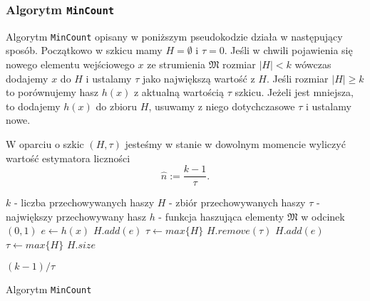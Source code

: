 \subsubsection{Algorytm \texttt{MinCount}}

Algorytm \texttt{MinCount} opisany w poniższym pseudokodzie działa w następujący sposób.
Początkowo w szkicu mamy $H = \emptyset$ i $\tau = 0$.
Jeśli w chwili pojawienia się nowego elementu wejściowego $x$
 ze strumienia $\mathfrak{M}$ rozmiar $|H|< k$ wówczas dodajemy $x$ do $H$ i ustalamy $\tau$ jako największą wartość z $H$.
 Jeśli rozmiar $|H|\geq k$ to porównujemy hasz $h(x)$ z aktualną wartością  ${\tau}$ szkicu. Jeżeli jest mniejsza, to dodajemy $h(x)$ do zbioru $H$, usuwamy z niego dotychczasowe ${\tau}$ i ustalamy nowe.

W oparciu o szkic $(H, {\tau})$ jesteśmy w stanie w dowolnym momencie wyliczyć wartość estymatora liczności $$\hat{n} := \frac{k - 1}{{\tau}}.$$

\begin{algorithm}
    \begin{algorithmic}
    \State $k$ -  liczba przechowywanych haszy 
    \State $H  $ - zbiór przechowywanych haszy
    \State $\tau  $ - największy przechowywany hasz 
    \State $h  $ - funkcja haszująca elementy $\mathfrak{M}$ w odcinek $(0, 1)$
    \newline
        \State $e \gets h(x)$
                \State $H.add(e)$
                \State $\tau \gets max\{H\}$
                \State $H.remove(\tau)$
                \State $H.add(e)$
                \State $\tau \gets max\{H\}$
            \EndIf
        \EndIf
    \EndFunction
    \newline
            \State \Return $H.size$
        
        \Else 
            \State \Return $(k - 1) / \tau$
        \EndIf
    \EndFunction
    
    \end{algorithmic}
    \caption{Algorytm \texttt{MinCount}}
\end{algorithm}


